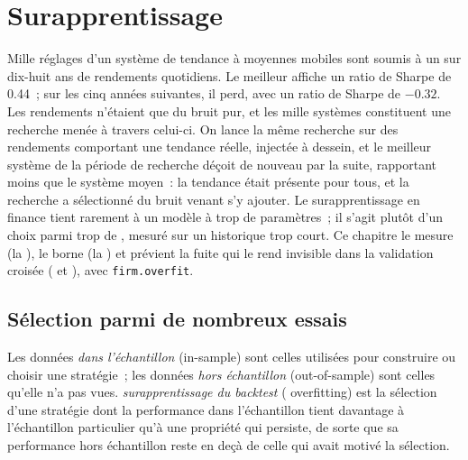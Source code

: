 \chapter{Surapprentissage}\label{ch:rs:overfitting}

Mille réglages d'un système de tendance à moyennes mobiles sont soumis à un  sur dix-huit ans de rendements quotidiens. Le meilleur affiche un ratio de Sharpe
de 0.44~; sur les cinq années suivantes, il perd, avec un ratio de Sharpe de $-0.32$. Les rendements n'étaient que du bruit pur, et les mille systèmes constituent une recherche menée à travers
celui-ci. On lance la même recherche sur des rendements comportant une tendance réelle, injectée à dessein, et le meilleur système de la période de recherche déçoit de nouveau par la suite, rapportant moins
que le système moyen~: la tendance était présente pour tous, et la recherche a sélectionné du bruit venant s'y ajouter. Le surapprentissage en finance tient rarement à un modèle
à trop de paramètres~; il s'agit plutôt d'un choix parmi trop de , mesuré sur un historique trop court. Ce chapitre le mesure (la ), le borne (la ) et prévient la fuite qui le rend invisible dans la validation croisée ( et
), avec \texttt{firm.overfit}.

\section{Sélection parmi de nombreux essais}

\begin{definition}\label{def:rs:overfitting:overfitting}
Les données \emph{dans l'échantillon} (in-sample) sont celles utilisées pour construire ou choisir une stratégie~; les données \emph{hors échantillon} (out-of-sample) sont celles
qu'elle n'a pas vues. \emph{surapprentissage du backtest} ( overfitting) est la sélection d'une stratégie dont la performance dans l'échantillon tient davantage à
l'échantillon particulier qu'à une propriété qui persiste, de sorte que sa performance hors échantillon reste en deçà de celle qui avait motivé la sélection.
\end{definition}

